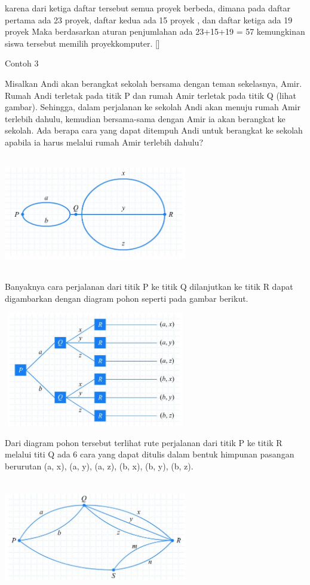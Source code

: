 \documentclass[11pt,fleqn]{book} %
\begin{document}
karena dari ketiga daftar tersebut semua proyek berbeda, dimana pada daftar pertama ada 23 proyek, daftar kedua ada 15 proyek , dan daftar ketiga ada 19 proyek Maka  berdasarkan aturan penjumlahan ada 23+15+19 = 57 kemungkinan siswa tersebut memilih proyekkomputer. []

Contoh 3

Misalkan Andi akan berangkat sekolah bersama dengan teman sekelasnya, Amir. Rumah Andi terletak pada titik P dan rumah Amir terletak pada titik Q (lihat gambar). Sehingga, dalam perjalanan ke sekolah Andi akan menuju rumah Amir terlebih dahulu, kemudian bersama-sama dengan Amir ia akan berangkat ke sekolah. Ada berapa cara yang dapat ditempuh Andi untuk berangkat ke sekolah apabila ia harus melalui rumah Amir terlebih dahulu?

 \includegraphics[width = 8cm, height= 5cm]{Pictures/contoh3.JPG}

Banyaknya cara perjalanan dari titik P ke titik Q dilanjutkan ke titik R dapat digambarkan dengan diagram pohon seperti pada gambar berikut.

 \includegraphics[width = 8cm, height= 5cm]{Pictures/contoh3a.JPG}
 
 Dari diagram pohon tersebut terlihat rute perjalanan dari titik P ke titik R melalui titi Q ada 6 cara yang dapat ditulis dalam bentuk himpunan pasangan berurutan {(a, x), (a, y), (a, z), (b, x), (b, y), (b, z)}. 

 
 \includegraphics[width = 8cm, height= 5cm]{Pictures/contoh3b.JPG}
 
\end{document}
